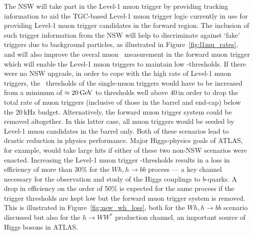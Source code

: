 The NSW will take part in the Level-1 muon trigger by providing
tracking information to aid the TGC-based Level-1 muon trigger logic currently in use for providing
Level-1 muon trigger candidates in the forward region.
The inclusion of such trigger information from the NSW will help to discriminate against
`fake' triggers due to background particles, as illustrated in Figure~\ref{fig:l1mu_rates},
and will also improve the overal muon \pT~measurement in the forward muon trigger which
will enable the Level-1 muon triggers to maintain low \pT-thresholds.
If there were no NSW upgrade, in order to cope with the high rate of Level-1 muon triggers,
the \pT~thresholds of the single-muon triggers would have to be increased from a minimum of $\approx20\,\text{Ge\kern -0.1em V}$
to thresholds well above 40\,\GeV in order to drop the total rate of muon triggers (inclusive of those
in the barrel and end-cap) below the 20\,kHz budget.
Alternatively, the forward muon trigger system could be removed altogether.
In this latter case, all muon triggers would be seeded by Level-1 muon candidates in the barrel only.
Both of these scenarios lead to drastic reduction in physics performance.
Major Higgs-physics goals of ATLAS, for example, would take large hits if either of these
two non-NSW scenarios were enacted.
Increasing the Level-1 muon trigger \pT-thresholds results in a loss in efficiency of more than
30\% for the $Wh,h\rightarrow bb$ process --- a key channel necessary for the observation and study
of the Higgs couplings to $b$-quarks.
A drop in efficiency on the order of 50\% is expected for the same process if the trigger thresholds
are kept low but the forward muon trigger system is removed.
This is illustrated in Figure~\ref{fig:nsw_wh_loss}, both for the $Wh,h\rightarrow bb$ scenario
discussed but also for the $h\rightarrow WW^*$ production channel, an important source of Higgs bosons
in ATLAS.



